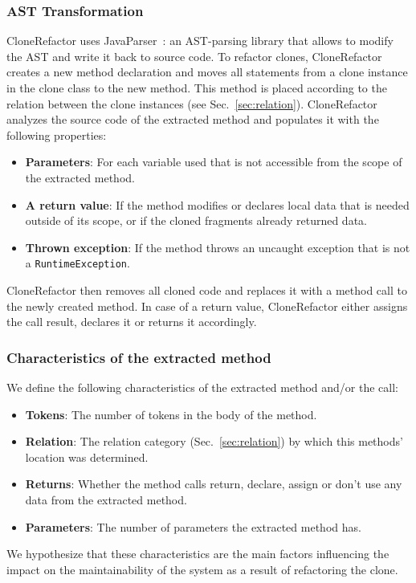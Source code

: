 \documentclass[conference]{IEEEtran}
\begin{document}
\subsubsection{AST Transformation}
CloneRefactor uses JavaParser~\cite{smith2017javaparser}: an AST-parsing library that allows to modify the AST and write it back to source code. To refactor clones, CloneRefactor creates a new method declaration and moves all statements from a clone instance in the clone class to the new method. This method is placed according to the relation between the clone instances (see Sec.~\ref{sec:relation}). CloneRefactor analyzes the source code of the extracted method and populates it with the following properties:
\begin{itemize}
  \item \textbf{Parameters}: For each variable used that is not accessible from the scope of the extracted method.
  \item \textbf{A return value}: If the method modifies or declares local data that is needed outside of its scope, or if the cloned fragments already returned data.
  \item \textbf{Thrown exception}: If the method throws an uncaught exception that is not a \texttt{RuntimeException}.
\end{itemize}
CloneRefactor then removes all cloned code and replaces it with a method call to the newly created method. In case of a return value, CloneRefactor either assigns the call result, declares it or returns it accordingly.

\subsubsection{Characteristics of the extracted method}\label{sec:characteristics}
We define the following characteristics of the extracted method and/or the call:
\begin{itemize}
\item \textbf{Tokens}: The number of tokens in the body of the method.
\item \textbf{Relation}: The relation category (Sec.~\ref{sec:relation}) by which this methods' location was determined.
\item \textbf{Returns}: Whether the method calls return, declare, assign or don't use any data from the extracted method.
\item \textbf{Parameters}: The number of parameters the extracted method has.
\end{itemize}
We hypothesize that these characteristics are the main factors influencing the impact on the maintainability of the system as a result of refactoring the clone.
\end{document}
